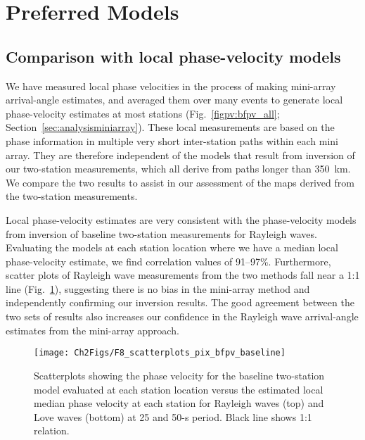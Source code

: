 \documentclass[12pt,oneside]{book}
\begin{document}
\section{Preferred Models}\label{sec:preferredmodel}

\subsection{Comparison with local phase-velocity models}\label{sec:bfpvresults}
We have measured local phase velocities in the process of making mini-array arrival-angle estimates, and averaged them over many events to generate local phase-velocity estimates at most stations (Fig.~\ref{figpv:bfpv_all}; Section~\ref{sec:analysisminiarray}). These local measurements are based on the phase information in multiple very short inter-station paths within each mini array. They are therefore independent of the models that result from inversion of our two-station measurements, which all derive from paths longer than 350~km. We compare the two results to assist in our assessment of the maps derived from the two-station measurements. 

Local phase-velocity estimates are very consistent with the phase-velocity models from inversion of baseline two-station measurements for Rayleigh waves. Evaluating the models at each station location where we have a median local phase-velocity estimate, we find correlation values of 91\nobreakdash--97\%. Furthermore, scatter plots of Rayleigh wave measurements from the two methods fall near a 1:1 line (Fig.~\ref{figpv:scatter}), suggesting there is no bias in the mini-array method and independently confirming our inversion results. The good agreement between the two sets of results also increases our confidence in the Rayleigh wave arrival-angle estimates from the mini-array approach. 

\begin{figure} 
\begin{center}
\texttt{[image: Ch2Figs/F8\_scatterplots\_pix\_bfpv\_baseline]} 
\caption[Comparison of two-station and local median phase-velocity maps]{Scatterplots showing the phase velocity for the baseline two-station model evaluated at each station location versus the estimated local median phase velocity at each station for Rayleigh waves (top) and Love waves (bottom) at 25 and 50-s period. Black line shows 1:1 relation.}
\label{figpv:scatter}
\end{center}
\end{figure}
%
\end{document}

